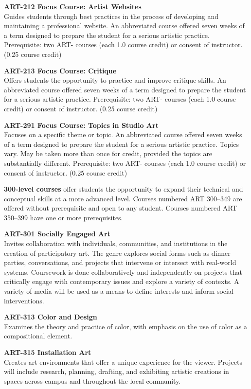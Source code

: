 \documentclass[
  letterpaper,
]{scrbook}
\begin{document}
\textbf{ART-212 Focus Course: Artist Websites}\\
Guides students through best practices in the process of developing and
maintaining a professional website. An abbreviated course offered seven
weeks of a term designed to prepare the student for a serious artistic
practice. Prerequisite: two ART- courses (each 1.0 course credit) or
consent of instructor. (0.25 course credit)

\textbf{ART-213 Focus Course: Critique}\\
Offers students the opportunity to practice and improve critique skills.
An abbreviated course offered seven weeks of a term designed to prepare
the student for a serious artistic practice. Prerequisite: two ART-
courses (each 1.0 course credit) or consent of instructor. (0.25 course
credit)

\textbf{ART-291 Focus Course: Topics in Studio Art}\\
Focuses on a specific theme or topic. An abbreviated course offered
seven weeks of a term designed to prepare the student for a serious
artistic practice. Topics vary. May be taken more than once for credit,
provided the topics are substantially different. Prerequisite: two ART-
courses (each 1.0 course credit) or consent of instructor. (0.25 course
credit)

\textbf{300-level courses} offer students the opportunity to expand
their technical and conceptual skills at a more advanced level. Courses
numbered ART 300--349 are offered without prerequisite and open to any
student. Courses numbered ART 350--399 have one or more prerequisites.

\textbf{ART-301 Socially Engaged Art}\\
Invites collaboration with individuals, communities, and institutions in
the creation of participatory art. The genre explores social forms such
as dinner parties, conversations, and projects that intervene or
intersect with real-world systems. Coursework is done collaboratively
and independently on projects that critically engage with contemporary
issues and explore a variety of contexts. A variety of media will be
used as a means to define interests and inform social interventions.

\textbf{ART-313 Color and Design}\\
Examines the theory and practice of color, with emphasis on the use of
color as a compositional element.

\textbf{ART-315 Installation Art}\\
Creates art environments that offer a unique experience for the viewer.
Projects will include research, planning, drafting, and exhibiting
artistic creations in spaces across campus and throughout the local
community.
\end{document}
